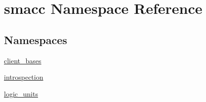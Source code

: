 \hypertarget{namespacesmacc}{}\section{smacc Namespace Reference}
\label{namespacesmacc}
\subsection*{Namespaces}
\begin{DoxyCompactItemize}
\item 
 \hyperlink{namespacesmacc_1_1client__bases}{client\+\_\+bases}
\item 
 \hyperlink{namespacesmacc_1_1introspection}{introspection}
\item 
 \hyperlink{namespacesmacc_1_1logic__units}{logic\+\_\+units}
\end{DoxyCompactItemize}
